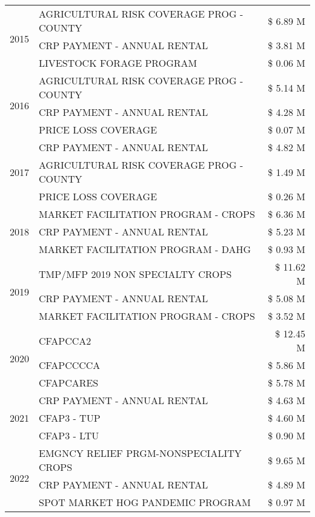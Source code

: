 \begin{tabular}{llr}
\multirow[t]{3}{*}{2015} & AGRICULTURAL RISK COVERAGE PROG - COUNTY & \$ 6.89 M \\
 & CRP PAYMENT - ANNUAL RENTAL & \$ 3.81 M \\
 & LIVESTOCK FORAGE PROGRAM & \$ 0.06 M \\
\cline{1-3}
\multirow[t]{3}{*}{2016} & AGRICULTURAL RISK COVERAGE PROG - COUNTY & \$ 5.14 M \\
 & CRP PAYMENT - ANNUAL RENTAL & \$ 4.28 M \\
 & PRICE LOSS COVERAGE & \$ 0.07 M \\
\cline{1-3}
\multirow[t]{3}{*}{2017} & CRP PAYMENT - ANNUAL RENTAL & \$ 4.82 M \\
 & AGRICULTURAL RISK COVERAGE PROG - COUNTY & \$ 1.49 M \\
 & PRICE LOSS COVERAGE & \$ 0.26 M \\
\cline{1-3}
\multirow[t]{3}{*}{2018} & MARKET FACILITATION PROGRAM - CROPS & \$ 6.36 M \\
 & CRP PAYMENT - ANNUAL RENTAL & \$ 5.23 M \\
 & MARKET FACILITATION PROGRAM - DAHG & \$ 0.93 M \\
\cline{1-3}
\multirow[t]{3}{*}{2019} & TMP/MFP 2019 NON SPECIALTY CROPS & \$ 11.62 M \\
 & CRP PAYMENT - ANNUAL RENTAL & \$ 5.08 M \\
 & MARKET FACILITATION PROGRAM - CROPS & \$ 3.52 M \\
\cline{1-3}
\multirow[t]{3}{*}{2020} & CFAPCCA2 & \$ 12.45 M \\
 & CFAPCCCCA & \$ 5.86 M \\
 & CFAPCARES & \$ 5.78 M \\
\cline{1-3}
\multirow[t]{3}{*}{2021} & CRP PAYMENT - ANNUAL RENTAL & \$ 4.63 M \\
 & CFAP3 - TUP & \$ 4.60 M \\
 & CFAP3 - LTU & \$ 0.90 M \\
\cline{1-3}
\multirow[t]{3}{*}{2022} & EMGNCY RELIEF PRGM-NONSPECIALITY CROPS & \$ 9.65 M \\
 & CRP PAYMENT - ANNUAL RENTAL & \$ 4.89 M \\
 & SPOT MARKET HOG PANDEMIC PROGRAM & \$ 0.97 M \\
\cline{1-3}
\bottomrule
\end{tabular}
